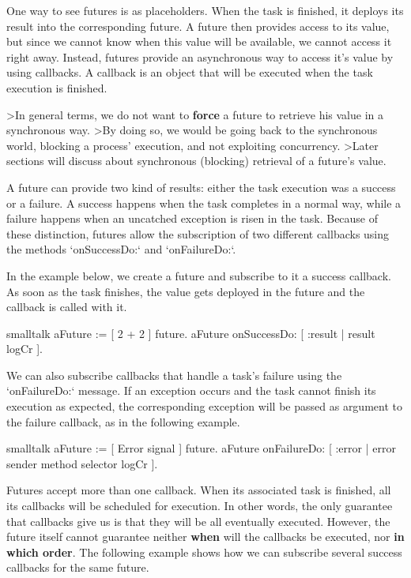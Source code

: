 \documentclass[10pt,twoside,english]{_support/latex/sbabook/sbabook}
\begin{document}
One way to see futures is as placeholders. When the task is finished, it deploys its result into the corresponding future. A future then provides access to its value, but since we cannot know when this value will be available, we cannot access it right away. Instead, futures provide an asynchronous way to access it's value by using callbacks. A callback is an object that will be executed when the task execution is finished.  

\textgreater{}In general terms, we do not want to \textbf{force} a future to retrieve his value in a synchronous way.
\textgreater{}By doing so, we would be going back to the synchronous world, blocking a process' execution, and not exploiting concurrency.
\textgreater{}Later sections will discuss about synchronous (blocking) retrieval of a future's value.

A future can provide two kind of results: either the task execution was a success or a failure. A success happens when the task completes in a normal way, while a failure happens when an uncatched exception is risen in the task. Because of these distinction, futures allow the subscription of two different callbacks using the methods `onSuccessDo:` and `onFailureDo:`.

In the example below, we create a future and subscribe to it a success callback. As soon as the task finishes, the value gets deployed in the future and the callback is called with it.

\begin{displaycode}{smalltalk}
aFuture := [ 2 + 2 ] future.
aFuture onSuccessDo: [ :result | result logCr ].
\end{displaycode}

We can also subscribe callbacks that handle a task's failure using the `onFailureDo:` message. If an exception occurs and the task cannot finish its execution as expected, the corresponding exception will be passed as argument to the failure callback, as in the following example.

\begin{displaycode}{smalltalk}
aFuture := [ Error signal ] future.
aFuture onFailureDo: [ :error | error sender method selector logCr ].
\end{displaycode}

Futures accept more than one callback. When its associated task is finished, all its callbacks will be scheduled for execution. In other words, the only guarantee that callbacks give us is that they will be all eventually executed. However, the future itself cannot guarantee neither \textbf{when} will the callbacks be executed, nor \textbf{in which order}. The following example shows how we can subscribe several success callbacks for the same future.
\end{document}
